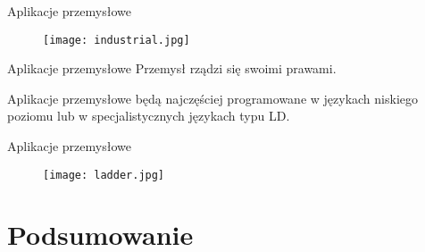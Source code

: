 \begin{frame}{Aplikacje przemysłowe}		
	\begin{figure}
		\centering
		\texttt{[image: industrial.jpg]}
	\end{figure}
\end{frame}

\begin{frame}{Aplikacje przemysłowe}		
	Przemysł rządzi się swoimi prawami. 
	
	Aplikacje przemysłowe będą najczęściej programowane w językach niskiego poziomu lub w specjalistycznych językach typu LD.
\end{frame}

\begin{frame}{Aplikacje przemysłowe}		
	\begin{figure}
		\centering
		\texttt{[image: ladder.jpg]}
	\end{figure}
\end{frame}

\section{Podsumowanie}

